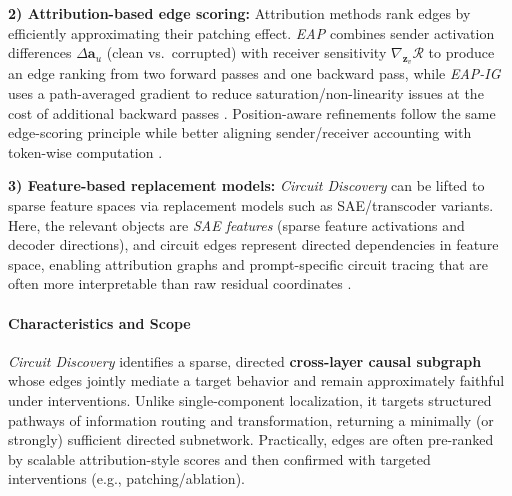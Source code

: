 \documentclass[11pt,letterpaper]{mystyle}
\begin{document}
\textbf{2) Attribution-based edge scoring:}
Attribution methods rank edges by efficiently approximating their patching effect.
\textit{EAP} combines sender activation differences $\Delta \mathbf{a}_u$ (clean vs.\ corrupted) with receiver sensitivity $\nabla_{\mathbf{z}_v}\mathcal{R}$ to produce an edge ranking from two forward passes and one backward pass, while \textit{EAP-IG} uses a path-averaged gradient to reduce saturation/non-linearity issues at the cost of additional backward passes \citep{syedetal2024attribution,hanna2024have,huang-etal-2025-pierce}.
Position-aware refinements follow the same edge-scoring principle while better aligning sender/receiver accounting with token-wise computation \citep{pacd2025,mib2025}.

\textbf{3) Feature-based replacement models:}
\textit{Circuit Discovery} can be lifted to sparse feature spaces via replacement models such as SAE/transcoder variants.
Here, the relevant objects are \textit{SAE features} (sparse feature activations and decoder directions), and circuit edges represent directed dependencies in feature space, enabling attribution graphs and prompt-specific circuit tracing that are often more interpretable than raw residual coordinates \citep{bricken2023monosemanticity,ameisen2025circuit,hanna-etal-2025-circuit}.

\paragraph{Characteristics and Scope}
\textit{Circuit Discovery} identifies a sparse, directed \textbf{cross-layer causal subgraph} whose edges jointly mediate a target behavior and remain approximately faithful under interventions.
Unlike single-component localization, it targets structured pathways of information routing and transformation, returning a minimally (or strongly) sufficient directed subnetwork.
Practically, edges are often pre-ranked by scalable attribution-style scores and then confirmed with targeted interventions (e.g., patching/ablation).
\end{document}
